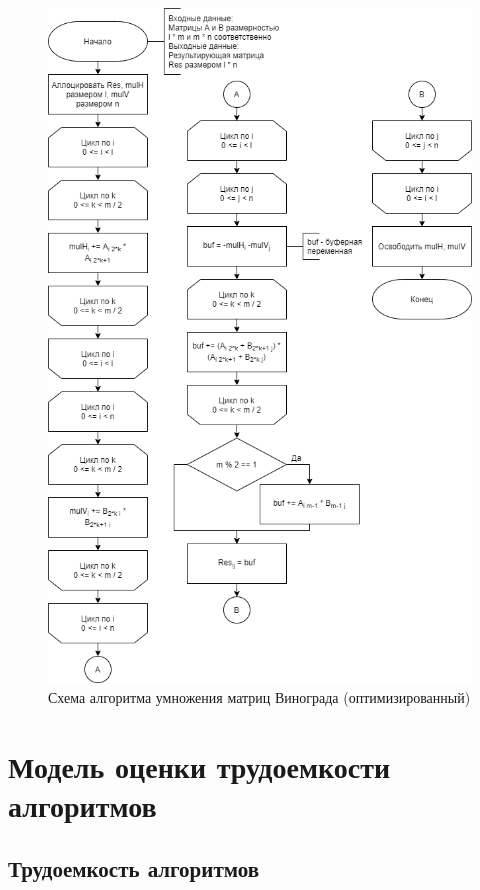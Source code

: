 \newpage 
\begin{figure}[h!]
	\begin{center}
		\includegraphics[scale=0.6]{assets/multVinOpt.png}
	\end{center}
	\caption{Схема алгоритма умножения матриц Винограда (оптимизированный)}
\end{figure}

\newpage
\section{Модель оценки трудоемкости алгоритмов}

\subsection{Трудоемкость алгоритмов}

